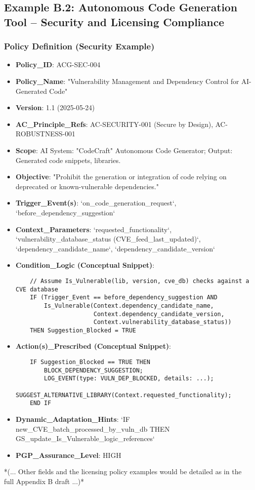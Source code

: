 \documentclass[sigconf,review,anonymous=false]{acmart} %
\begin{document}
\subsection{Example B.2: Autonomous Code Generation Tool – Security and Licensing Compliance}
\label{app:policy_example_codegen}
\subsubsection{Policy Definition (Security Example)}
\begin{itemize}
    \item \textbf{Policy\_ID}: ACG-SEC-004
    \item \textbf{Policy\_Name}: "Vulnerability Management and Dependency Control for AI-Generated Code"
    \item \textbf{Version}: 1.1 (2025-05-24)
    \item \textbf{AC\_Principle\_Refs}: AC-SECURITY-001 (Secure by Design), AC-ROBUSTNESS-001
    \item \textbf{Scope}: AI System: "CodeCraft" Autonomous Code Generator; Output: Generated code snippets, libraries.
    \item \textbf{Objective}: "Prohibit the generation or integration of code relying on deprecated or known-vulnerable dependencies."
    \item \textbf{Trigger\_Event(s)}: `on_code_generation_request`, `before_dependency_suggestion`
    \item \textbf{Context\_Parameters}: `requested_functionality`, `vulnerability_database_status (CVE_feed_last_updated)`, `dependency_candidate_name`, `dependency_candidate_version`
    \item \textbf{Condition\_Logic (Conceptual Snippet)}:
    \begin{verbatim}
    // Assume Is_Vulnerable(lib, version, cve_db) checks against a CVE database
    IF (Trigger_Event == before_dependency_suggestion AND
        Is_Vulnerable(Context.dependency_candidate_name,
                      Context.dependency_candidate_version,
                      Context.vulnerability_database_status))
    THEN Suggestion_Blocked = TRUE
    \end{verbatim}
    \item \textbf{Action(s)\_Prescribed (Conceptual Snippet)}:
    \begin{verbatim}
    IF Suggestion_Blocked == TRUE THEN
        BLOCK_DEPENDENCY_SUGGESTION;
        LOG_EVENT(type: VULN_DEP_BLOCKED, details: ...);
        SUGGEST_ALTERNATIVE_LIBRARY(Context.requested_functionality);
    END IF
    \end{verbatim}
    \item \textbf{Dynamic\_Adaptation\_Hints}: `IF new_CVE_batch_processed_by_vuln_db THEN GS_update_Is_Vulnerable_logic_references`
    \item \textbf{PGP\_Assurance\_Level}: HIGH
\end{itemize}
*(... Other fields and the licensing policy examples would be detailed as in the full Appendix B draft ...)*
\end{document}
